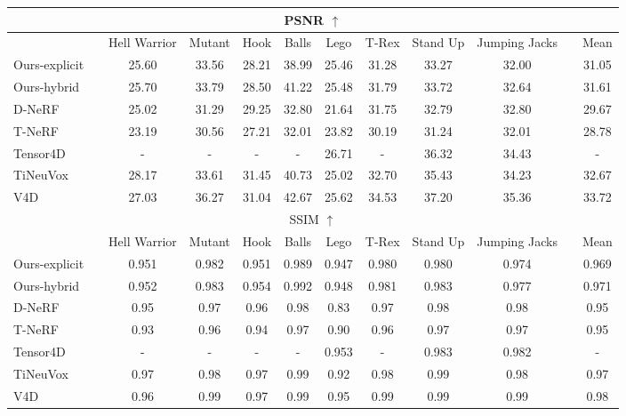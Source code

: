 \documentclass[10pt,twocolumn,letterpaper]{article}
\begin{document}
\renewcommand{\tabcolsep}{6pt}
\begin{table*}
  \centering
  \begin{tabular}{llcccccccclc}
    \multicolumn{12}{c}{PSNR $\uparrow$} \\
    \toprule
     & & Hell Warrior & Mutant & Hook & Balls  & Lego & T-Rex & Stand Up & Jumping Jacks & & Mean \\ 
     \cmidrule(){1-1} \cmidrule(){3-10} \cmidrule(){12-12}
Ours-explicit && 25.60 &	33.56 &	28.21 &	38.99 &	25.46 &	31.28 &	33.27 &	32.00 &&	31.05 \\
     Ours-hybrid && 25.70 &	33.79 &	28.50 &	41.22 &	25.48 &	31.79 &	33.72 &	32.64 &&	31.61 \\
D-NeRF \cite{dnerf} && 25.02 & 31.29	& 29.25 & 32.80	& 21.64	& 31.75 &	32.79 &	32.80 &&	29.67 \\
    T-NeRF \cite{dnerf} &&	23.19 &	30.56 &	27.21 &	32.01	& 23.82 &	30.19 &	31.24 &	32.01 &&	28.78 \\
Tensor4D \cite{tensor4d} && - & - & - & - &	26.71 &	- & 36.32	& 34.43 &&	- \\
TiNeuVox \cite{tineuvox} && 28.17	& 33.61 &	31.45 &	40.73 &	25.02 &	32.70 &	35.43 &	34.23 &&	32.67 \\
V4D \cite{v4d}	&& 27.03	& 36.27 &	31.04 &	42.67 &	25.62 &	34.53 &	37.20 &	35.36 &&	33.72 \\
    \bottomrule
    \multicolumn{12}{c}{SSIM $\uparrow$} \\
    \toprule
     & & Hell Warrior & Mutant & Hook & Balls  & Lego & T-Rex & Stand Up & Jumping Jacks & & Mean \\ 
     \cmidrule(){1-1} \cmidrule(){3-10} \cmidrule(){12-12}
Ours-explicit && 0.951 &	0.982 &	0.951 &	0.989 &	0.947 &	0.980 &	0.980 &	0.974 &&	0.969 \\
     Ours-hybrid && 0.952 &	0.983 &	0.954 &	0.992 &	0.948 &	0.981 &	0.983 &	0.977 &&	0.971 \\
D-NeRF \cite{dnerf} && 0.95 &	0.97 &	0.96 &	0.98 &	0.83 &	0.97 &	0.98 &	0.98 &&	0.95 \\
    T-NeRF \cite{dnerf} &&	0.93 &	0.96 &	0.94 &	0.97 &	0.90 &	0.96 &	0.97 &	0.97 &&	0.95 \\
Tensor4D \cite{tensor4d} && - & - & - & - &	0.953 &	- & 0.983 & 0.982 &&	- \\
TiNeuVox \cite{tineuvox} && 0.97 &	0.98 &	0.97 &	0.99 &	0.92 &	0.98 &	0.99 &	0.98 &&	0.97 \\
V4D \cite{v4d}	&& 0.96 &	0.99 &	0.97 &	0.99 &	0.95	& 0.99	& 0.99	& 0.99	&& 0.98 \\

\end{tabular}
\end{table*}
\end{document}
